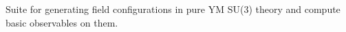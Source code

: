 Suite for generating field configurations in pure YM S\+U(3) theory and compute basic observables on them. 
